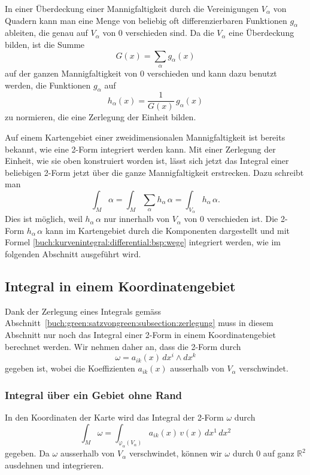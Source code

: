 In einer Überdeckung einer Mannigfaltigkeit durch die Vereinigungen
$V_\alpha$ von Quadern kann man eine Menge von beliebig oft
differenzierbaren Funktionen
$g_\alpha$ ableiten, die genau auf $V_\alpha$ von $0$ verschieden
sind.
Da die $V_\alpha$ eine Überdeckung bilden, ist die Summe
\[
G(x) = \sum_{\alpha} g_\alpha(x)
\]
auf der ganzen Mannigfaltigkeit von $0$ verschieden und kann dazu
benutzt werden, die Funktionen $g_\alpha$ auf
\[
h_\alpha(x) = \frac{1}{G(x)}\,g_\alpha(x)
\]
zu normieren, die eine Zerlegung der Einheit bilden.

Auf einem Kartengebiet einer zweidimensionalen Mannigfaltigkeit
ist bereits bekannt, wie eine 2-Form integriert werden kann.
Mit einer Zerlegung der Einheit, wie sie oben konstruiert worden ist,
lässt sich jetzt das Integral einer beliebigen 2-Form jetzt über
die ganze Mannigfaltigkeit erstrecken.
Dazu schreibt man
\[
\int_M \alpha
=
\int_M \sum_{\alpha}h_\alpha\,\alpha
=
\int_{V_\alpha} h_\alpha\,\alpha.
\]
Dies ist möglich, weil $h_\alpha\,\alpha$ nur innerhalb von $V_\alpha$
von $0$ verschieden ist.
Die 2-Form $h_\alpha\,\alpha$ kann im Kartengebiet durch die
Komponenten dargestellt und mit Formel
\eqref{buch:kurvenintegral:differential:bsp:wege}
integriert werden, wie im folgenden Abschnitt ausgeführt wird.

%
%
\subsection{Integral in einem Koordinatengebiet}
Dank der Zerlegung eines Integrals gemäss
Abschnitt~\ref{buch:green:satzvongreen:subsection:zerlegung}
muss in diesem Abschnitt nur noch das Integral einer 2-Form in
einem Koordinatengebiet berechnet werden.
Wir nehmen daher an, dass die 2-Form durch
\[
\omega
=
a_{ik}(x)\,dx^i\wedge dx^k
\]
gegeben ist, wobei die Koeffizienten $a_{ik}(x)$ ausserhalb
von $V_\alpha$ verschwindet.

%
%
\subsubsection{Integral über ein Gebiet ohne Rand}
In den Koordinaten der Karte wird das Integral der 2-Form $\omega$
durch
\begin{equation}
\int_M \omega
=
\int_{\varphi_\alpha(V_\alpha)}
a_{ik}(x)\, v(x)
\,dx^1\,dx^2
\label{buch:green:green:eqn:koordinatenform}
\end{equation}
gegeben.
Da $\omega$ ausserhalb von $V_\alpha$ verschwindet, können wir $\omega$
durch 0 auf ganz $\mathbb{R}^2$ ausdehnen und integrieren.

